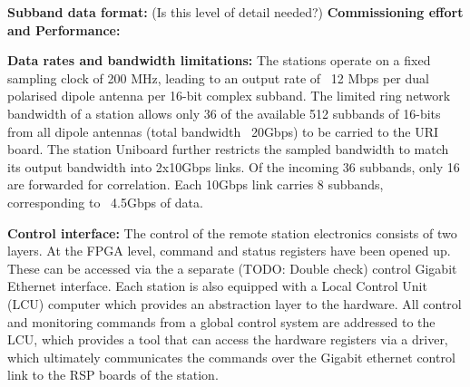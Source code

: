 \documentclass{ws-jai}
\begin{document}
\textbf  {Subband data  format:}  (Is this level of detail needed?)
\textbf {Commissioning effort and Performance:}

\textbf {Data rates and bandwidth limitations: } The stations operate on a fixed
sampling  clock of  200 MHz,  leading to  an output  rate of  ~12 Mbps  per dual
polarised dipole  antenna per 16-bit  complex subband. The limited  ring network
bandwidth of a station  allows only 36 of the available  512 subbands of 16-bits
from all  dipole antennas  (total bandwidth  ~20Gbps) to be  carried to  the URI
board.  The  station Uniboard further  restricts the sampled bandwidth  to match
its output bandwidth into 2x10Gbps links.   Of the incoming 36 subbands, only 16
are  forwarded   for  correlation.   Each  10Gbps   link  carries   8  subbands,
corresponding to ~4.5Gbps of data.


\textbf  {Control interface:}  The  control of  the  remote station  electronics
consists of  two layers. At  the FPGA level,  command and status  registers have
been opened up.  These can be accessed  via the a separate  (TODO: Double check)
control Gigabit Ethernet  interface. Each station is also equipped  with a Local
Control  Unit  (LCU)  computer  which  provides  an  abstraction  layer  to  the
hardware. All control  and monitoring commands from a global  control system are
addressed  to the  LCU,  which provides  a  tool that  can  access the  hardware
registers  via a  driver, which  ultimately communicates  the commands  over the
Gigabit ethernet control link to the RSP boards of the station.
\end{document}

